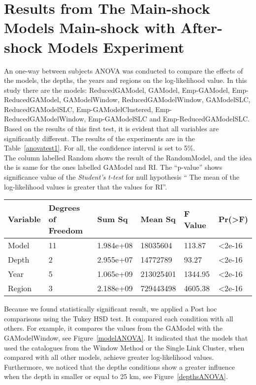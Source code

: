\section{Results from The Main-shock Models Main-shock with After-shock Models Experiment}\label{resultsBigExp}

An one-way between subjects ANOVA was conducted to compare the effects of the models, the depths, the years and regions on the log-likelihood value. In this study there are the models: ReducedGAModel, GAModel, Emp-GAModel, Emp-ReducedGAModel, GAModelWindow, ReducedGAModelWindow, GAModelSLC, ReducedGAModelSLC, Emp-GAModelClustered, Emp-ReducedGAModelWindow, Emp-GAModelSLC and Emp-ReducedGAModelSLC.  \\

Based on the results of this first test, it is evident that all variables are significantly different. The results of the experiments are in the Table~\ref{anovatest1}. For all, the confidence interval is set to 5\%.\\

The column labelled Random shows the result of the RandomModel, and the idea the is same for the ones labelled GAModel and RI. The ``p-value'' shows significance value of the {\it Student's t-test} for null hypothesis `` The mean of the log-likelihood values is greater that the values for RI''.\\

\begin{table*}[!ht]
	\centering
	\begin{tabular}{|l|l|l|l|l|l|}
		\hline
		{Variable} & {Degrees of Freedom} & {Sum Sq}    & {Mean Sq}   & {F Value} & {Pr(\textgreater F)} \\
		\hline
		Model    & 11           	  & 1.984e+08  & 18035604   & 113.87    & \textless2e-16     \\
		\hline
		Depth    & 2                  & 2.955e+07  & 14772789   & 93.27     & \textless2e-16     \\
		\hline
		Year     & 5                  & 1.065e+09  & 213025401  & 1344.95   & \textless2e-16     \\
		\hline
		Region   & 3                  & 2.188e+09  & 729443498  & 4605.38   & \textless2e-16	\\    
		\hline
	\end{tabular}
	\caption{Simple ANOVA Test Results.}
	\label{anovatest1}
\end{table*}


Because we found statistically significant result, we applied a Post hoc comparisons using the Tukey HSD test. It compared each condition with all others. For example, it compares the values from the GAModel with the GAModelWindow, see Figure~\ref{modelANOVA}. It indicated that the models that used the catalogues from the Window Method or the Single Link Cluster, when compared with all other models, achieve greater log-likelihood values. Furthermore, we noticed that the depths conditions show a greater influence when the depth in smaller or equal to 25 km, see Figure~\ref{depthsANOVA}.\\

